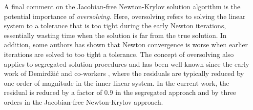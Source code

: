 \documentclass[sn-mathphys,Numbered]{sn-jnl}%
\begin{document}
A final comment on the Jacobian-free Newton-Krylov solution algorithm is the potential importance of \emph{oversolving}.
Here, oversolving refers to solving the linear system to a tolerance that is too tight during the early Newton iterations, essentially wasting time when the solution is far from the true solution.
In addition, some authors %
\cite{Knoll2004} has shown that Newton convergence is worse when earlier iterations are solved to too tight a tolerance.
The concept of oversolving also applies to segregated solution procedures and has been well-known since the early work of Demird\v{z}i\'{c} and co-workers \cite{Demirdzic1995}, where the residuals are typically reduced by one order of magnitude in the inner linear system.
In the current work, the residual is reduced by a factor of 0.9 in the segregated approach and by three orders in the Jacobian-free Newton-Krylov approach.



\end{document}
